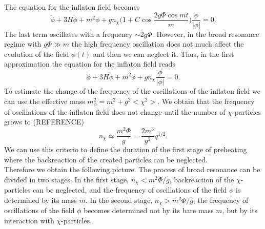 \documentclass[11pt,a4paper,twoside]{book}
\begin{document}
The equation for the inflaton field becomes
\begin{equation}
\label{Chap4:Backreaction_equationInflaton}
\ddot{\phi} + 3H\dot{\phi} + m^{2}\phi + gn_{\chi}\Bigg(1 + C\cos \frac{2g\Phi 	\cos mt}{m}\Bigg) \frac{\phi}{|\phi|} = 0.
\end{equation}
The last term oscillates with a frequency $\sim 2g\Phi$. However, in the broad resonance regime with $ g\Phi \gg m $ the high frequency oscillation does not much affect the evolution of the field $ \phi(t) $ and then we can neglect it.
Thus, in the first approximation the equation for the inflaton field reads
\begin{equation}
	\label{Chap4:Backreaction_EquationPhiFinal}
	\ddot{\phi} + 3H\dot{\phi} + m^{2}\phi + gn_{\chi}\frac{\phi}{|\phi|} = 0.
\end{equation}
To estimate the change of the frequency of the oscillations of the inflaton field we can use the effective mass $ m^{2}_{\phi}=m^{2} + g^{2}<\chi^{2}> $. We obtain that the frequency of oscillations of the inflaton field does not change until the number of $ \chi $-particles grows to (REFERENCE)
\begin{equation}
\label{Chap4:Backreaction_CriterionFirstStage}
n_{\chi} \simeq \frac{m^{2}\Phi}{g}=\frac{2m^{3}}{g^{2}}q^{1/2}.
\end{equation}
We can use this criterio to define the duration of the first stage of preheating where the backreaction of the created particles can be neglected. \\
Therefore we obtain the following picture. The process of broad resonance can be divided in two stages. In the first stage, $ n_{\chi} < m^{2}\Phi/g $, backreaction of the $ \chi $-particles can be neglected, and the frequency of oscillations of the field $ \phi $ is determined by its mass $ m $. In the second stage, $ n_{\chi} > m^{2}\Phi/g $, the frequency of oscillations of the field $\phi$ becomes determined not by its bare mass $ m $, but by its interaction with $\chi$-particles.\\
\end{document}
